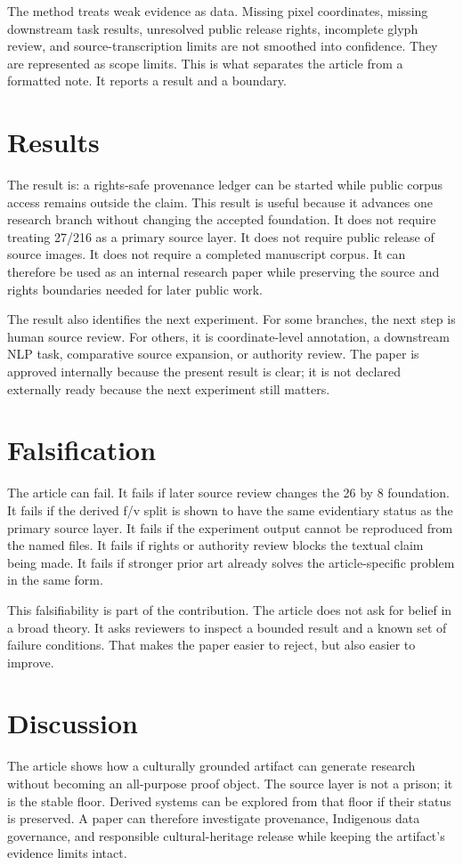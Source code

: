 \documentclass[sigconf,nonacm]{acmart}
\begin{document}
The method treats weak evidence as data. Missing pixel coordinates, missing
downstream task results, unresolved public release rights, incomplete glyph
review, and source-transcription limits are not smoothed into confidence. They
are represented as scope limits. This is what separates the article from a
formatted note. It reports a result and a boundary.

\section{Results}
The result is: a rights-safe provenance ledger can be started while public corpus access remains outside the claim. This result is useful because it advances one research
branch without changing the accepted foundation. It does not require treating
27/216 as a primary source layer. It does not require public release of source
images. It does not require a completed manuscript corpus. It can therefore be
used as an internal research paper while preserving the source and rights
boundaries needed for later public work.

The result also identifies the next experiment. For some branches, the next step
is human source review. For others, it is coordinate-level annotation, a
downstream NLP task, comparative source expansion, or authority review. The
paper is approved internally because the present result is clear; it is not
declared externally ready because the next experiment still matters.

\section{Falsification}
The article can fail. It fails if later source review changes the 26 by 8
foundation. It fails if the derived f/v split is shown to have the same
evidentiary status as the primary source layer. It fails if the experiment output
cannot be reproduced from the named files. It fails if rights or authority review
blocks the textual claim being made. It fails if stronger prior art already
solves the article-specific problem in the same form.

This falsifiability is part of the contribution. The article does not ask for
belief in a broad theory. It asks reviewers to inspect a bounded result and a
known set of failure conditions. That makes the paper easier to reject, but also
easier to improve.

\section{Discussion}
The article shows how a culturally grounded artifact can generate research
without becoming an all-purpose proof object. The source layer is not a prison;
it is the stable floor. Derived systems can be explored from that floor if their
status is preserved. A paper can therefore investigate provenance, Indigenous data governance, and responsible cultural-heritage release while keeping the
artifact's evidence limits intact.
\end{document}
